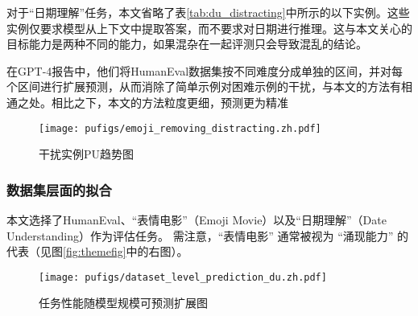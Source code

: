 对于“日期理解”任务，本文省略了表\ref{tab:du_distracting}中所示的以下实例。这些实例仅要求模型从上下文中提取答案，而不要求对日期进行推理。这与本文关心的目标能力是两种不同的能力，如果混杂在一起评测只会导致混乱的结论。

在GPT-4报告\citep{openai2023gpt4}中，他们将HumanEval数据集按不同难度分成单独的区间，并对每个区间进行扩展预测，从而消除了简单示例对困难示例的干扰，与本文的方法有相通之处。相比之下，本文的方法粒度更细，预测更为精准

\begin{table}[!htbp]
\centering
\caption{“日期理解”任务中的干扰实例}
    \label{tab:du_distracting}
\end{table}

\begin{figure}[h]
    \centering
\texttt{[image: pufigs/emoji\_removing\_distracting.zh.pdf]}
\caption{干扰实例PU趋势图}
    \label{fig:emoji_common_words}
\end{figure}



\subsubsection{数据集层面的拟合}
本文选择了HumanEval\citep{chen2021evaluating}、“表情电影”（Emoji Movie）以及“日期理解”（Date Understanding）\citep{srivastava2022beyond}作为评估任务。
需注意，“表情电影” 通常被视为 “涌现能力” 的代表\citep{srivastava2022beyond}（见图\ref{fig:themefig}中的右图）。


\begin{figure}[!htbp]
        \centering
        \texttt{[image: pufigs/dataset\_level\_prediction\_du.zh.pdf]}
        \caption{任务性能随模型规模可预测扩展图}
    \label{fig:dpu}
\end{figure}

